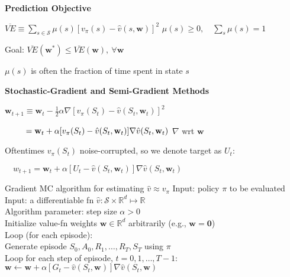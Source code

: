 \documentclass[twocolumn]{article}
\begin{document}
\cleardoublepage


\textbf{Prediction Objective}

$\overline{VE} \equiv \sum_{s \in \mathcal S} \mu(s)[v_\pi(s) - \hat v(s, \mathbf w)]^2$ \hfill $\mu(s) \geq 0, \quad \sum_s \mu(s) = 1$

Goal: $\overline{VE}(\mathbf w^*) \leq \overline{VE}(\mathbf w),\ \forall \mathbf w$

$\mu(s)$ is often the fraction of time spent in state $s$

\vspace{-.5em}
\dotfill

\textbf{Stochastic-Gradient and Semi-Gradient Methods}

$\mathbf w_{t+1} \equiv \mathbf w_t - \frac{1}{2}\alpha \nabla[v_\pi(S_t) - \hat v(S_t, \mathbf w_t)]^2$

$\hspace{2.5em} = \mathbf w_t + \alpha [v_\pi(S_t) - \hat v(S_t, \mathbf w_t)] \nabla \hat v(S_t, \mathbf w_t)$ \hfill $\nabla$ wrt $\mathbf w$

Oftentimes $v_\pi(S_t)$ noise-corrupted, so we denote target as $U_t$:

$\quad w_{t+1} = \mathbf w_t + \alpha [U_t - \hat v(S_t, \mathbf w_t)] \nabla \hat v(S_t, \mathbf w_t)$

\begin{mydef}{Gradient MC algorithm for estimating $\hat v \approx v_\pi$}{}
    Input: policy $\pi$ to be evaluated \\
    Input: a differentiable fn $\hat v: \mathcal S \times \mathbb R^d \mapsto \mathbb R$ \\
    Algorithm parameter: step size $\alpha > 0$ \\
    Initialize value-fn weights $\mathbf w \in \mathbb R^d$ arbitrarily (e.g., $\mathbf w = \mathbf 0$) \\
    Loop (for each episode): \\
        \hspace*{2em}Generate episode $S_0, A_0, R_1, \dots, R_T, S_T$ using $\pi$ \\
        \hspace*{2em}Loop for each step of episode, $t = 0, 1, \dots, T-1$: \\
        \hspace*{4em}$\mathbf w \leftarrow \mathbf w + \alpha [G_t - \hat v(S_t, \mathbf w)] \nabla \hat v(S_t, \mathbf w)$
\end{mydef}

\dotfill
\end{document}
